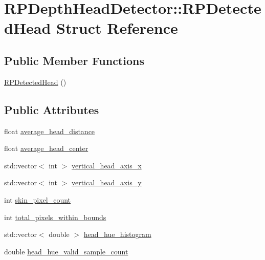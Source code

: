 \hypertarget{struct_r_p_depth_head_detector_1_1_r_p_detected_head}{\section{\-R\-P\-Depth\-Head\-Detector\-:\-:\-R\-P\-Detected\-Head \-Struct \-Reference}
\label{struct_r_p_depth_head_detector_1_1_r_p_detected_head}
}
\subsection*{\-Public \-Member \-Functions}
\begin{DoxyCompactItemize}
\item 
\hyperlink{struct_r_p_depth_head_detector_1_1_r_p_detected_head_a2a99a294c4be2453f4ed06641243f6fa}{\-R\-P\-Detected\-Head} ()
\end{DoxyCompactItemize}
\subsection*{\-Public \-Attributes}
\begin{DoxyCompactItemize}
\item 
float \hyperlink{struct_r_p_depth_head_detector_1_1_r_p_detected_head_a92be67447e859e5abd7dfa8c7b10d0db}{average\-\_\-head\-\_\-distance}
\item 
float \hyperlink{struct_r_p_depth_head_detector_1_1_r_p_detected_head_a2a0c01a0e79f509deaf00fd15835336f}{average\-\_\-head\-\_\-center}
\item 
std\-::vector$<$ int $>$ \hyperlink{struct_r_p_depth_head_detector_1_1_r_p_detected_head_a2458d0ecfa6876479380ec2902e1faa5}{vertical\-\_\-head\-\_\-axis\-\_\-x}
\item 
std\-::vector$<$ int $>$ \hyperlink{struct_r_p_depth_head_detector_1_1_r_p_detected_head_a0dc5868e140712e5626cf370d0c6fcf7}{vertical\-\_\-head\-\_\-axis\-\_\-y}
\item 
int \hyperlink{struct_r_p_depth_head_detector_1_1_r_p_detected_head_ab34adf4b500187edd8eac4880ea6bfe9}{skin\-\_\-pixel\-\_\-count}
\item 
int \hyperlink{struct_r_p_depth_head_detector_1_1_r_p_detected_head_a08df447be8416e1e442bf06745b74d8b}{total\-\_\-pixels\-\_\-within\-\_\-bounds}
\item 
std\-::vector$<$ double $>$ \hyperlink{struct_r_p_depth_head_detector_1_1_r_p_detected_head_ac5b498728e120762489f784a9ad46d9e}{head\-\_\-hue\-\_\-histogram}
\item 
double \hyperlink{struct_r_p_depth_head_detector_1_1_r_p_detected_head_aab08a511d1bcda0c0ad0483abac1b33a}{head\-\_\-hue\-\_\-valid\-\_\-sample\-\_\-count}
\end{DoxyCompactItemize}


